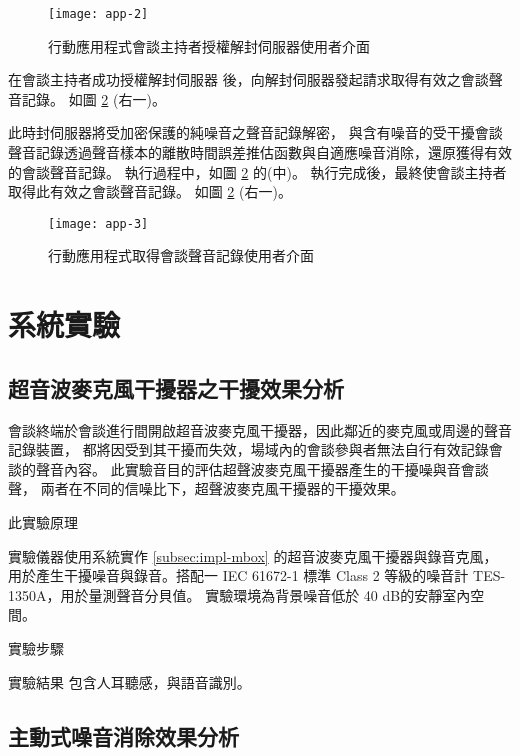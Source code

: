 \begin{figure}[H]
    \centering
    \texttt{[image: app-2]}
    \caption{行動應用程式會談主持者授權解封伺服器使用者介面}\label{fig:app-2}
\end{figure}

    在會談主持者成功授權解封伺服器 \DEFserver 後，向解封伺服器發起請求取得有效之會談聲音記錄。
如圖 \ref{fig:app-3} (右一)。

    此時封伺服器將受加密保護的純噪音之聲音記錄解密，
與含有噪音的受干擾會談聲音記錄透過聲音樣本的離散時間誤差推估函數與自適應噪音消除，還原獲得有效的會談聲音記錄。
執行過程中，如圖 \ref{fig:app-3} 的(中)。
執行完成後，最終使會談主持者取得此有效之會談聲音記錄。
如圖 \ref{fig:app-3} (右一)。

\begin{figure}[H]
    \centering
    \texttt{[image: app-3]}
    \caption{行動應用程式取得會談聲音記錄使用者介面}\label{fig:app-3}
\end{figure}


\section{系統實驗}

\subsection{超音波麥克風干擾器之干擾效果分析}\label{subsec:exp-jammer}

    會談終端於會談進行間開啟超音波麥克風干擾器，因此鄰近的麥克風或周邊的聲音記錄裝置，
都將因受到其干擾而失效，場域內的會談參與者無法自行有效記錄會談的聲音內容。
此實驗音目的評估超聲波麥克風干擾器產生的干擾噪與音會談聲，
兩者在不同的信噪比下，超聲波麥克風干擾器的干擾效果。

    此實驗原理\cite{chen2019understanding}

    實驗儀器使用系統實作 \ref{subsec:impl-mbox} 的超音波麥克風干擾器與錄音克風，
用於產生干擾噪音與錄音。搭配一 IEC 61672-1 標準 Class 2 等級的噪音計 TES-1350A，用於量測聲音分貝值。
實驗環境為背景噪音低於 40 dB的安靜室內空間。

    實驗步驟

    實驗結果
包含人耳聽感，與語音識別。


\subsection{主動式噪音消除效果分析}

